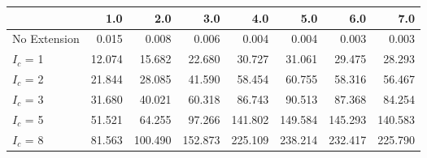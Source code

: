 \begin{tabular}{lrrrrrrr}
\toprule
{} &    1.0 &     2.0 &     3.0 &     4.0 &     5.0 &     6.0 &     7.0 \\
\midrule
No Extension &  0.015 &   0.008 &   0.006 &   0.004 &   0.004 &   0.003 &   0.003 \\
$I_c$ = 1    & 12.074 &  15.682 &  22.680 &  30.727 &  31.061 &  29.475 &  28.293 \\
$I_c$ = 2    & 21.844 &  28.085 &  41.590 &  58.454 &  60.755 &  58.316 &  56.467 \\
$I_c$ = 3    & 31.680 &  40.021 &  60.318 &  86.743 &  90.513 &  87.368 &  84.254 \\
$I_c$ = 5    & 51.521 &  64.255 &  97.266 & 141.802 & 149.584 & 145.293 & 140.583 \\
$I_c$ = 8    & 81.563 & 100.490 & 152.873 & 225.109 & 238.214 & 232.417 & 225.790 \\
\bottomrule
\end{tabular}
